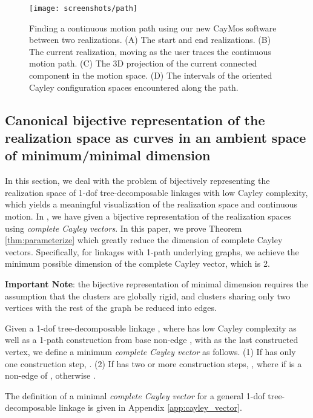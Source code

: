 \documentclass[secthm,amsthm,english]{article}
\theoremstyle{definition}
\theoremstyle{remark}
\begin{document}
\begin{figure}[hbtp]
\begin{center}
	\texttt{[image: screenshots/path]}
\end{center}

\caption{Finding a continuous motion path using our new CayMos software \protect\cite{bib:caymos} between two realizations. 
(A) The start and end realizations.
(B) The current realization, moving as the user traces the continuous motion path. 
(C) The 3D projection of the current connected component in the motion space. 
(D) The intervals of the oriented Cayley configuration spaces encountered along the path. }
\label{F:caymos_path}
\end{figure}

\subsection{Canonical bijective representation of the realization space as curves in an ambient space of minimum/minimal dimension}
\label{sec:ambient}

In this section, we deal with the problem of bijectively representing 
the realization space of 1-dof tree-decomposable linkages with low Cayley complexity,
which yields a meaningful visualization of the realization space and continuous motion.
In \cite{bib:beest}, we have given a bijective representation 
of the realization spaces using \emph{complete Cayley vectors}.
In this paper, we prove  Theorem \ref{thm:parameterize}
which greatly reduce the dimension of complete Cayley vectors. 
Specifically, for linkages with 1-path underlying graphs, 
we achieve the minimum possible dimension of the complete Cayley vector, which is 2.

\noindent\textbf{Important Note}: the bijective representation of minimal dimension requires the assumption 
that the clusters are globally rigid, and 
clusters sharing only two vertices with the rest of the graph be reduced into edges. 
\smallskip

Given a 1-dof tree-decomposable linkage , 
where  has low Cayley complexity as well as a 1-path construction from base non-edge , with  as the last constructed vertex, 
we define a minimum \emph{complete Cayley vector}  as follows.
(1) If  has only one construction step, .
(2) If  has two or more construction steps, , 
where  if  is a non-edge of , otherwise . 

The definition of a minimal \emph{complete Cayley vector}
for a general 1-dof tree-decomposable linkage 
is given  in Appendix \ref{app:cayley_vector}.
\end{document}
